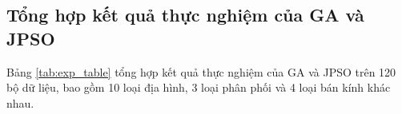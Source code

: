 \documentclass{hust}
\begin{document}
\pagebreak
\subsection{Tổng hợp kết quả thực nghiệm của \gls{GA} và \gls{JPSO}}


Bảng \ref{tab:exp_table} tổng hợp kết quả thực nghiệm của \gls{GA} và \gls{JPSO} trên 120 bộ dữ liệu, bao gồm 10 loại địa hình, 3 loại phân phối và 4 loại bán kính khác nhau.
\end{document}
